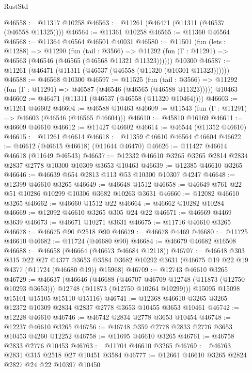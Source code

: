 \begin{lexlean}{RustStd}
\begin{coremodule}
@46558 := @11317 @10258
@46563 := @11261 (@46471 (@11311 (@46537 (@46558 @11325))))
@46564 := @11361 @10258
@46565 := @11360 @46564
@46568 := @11364 @46564 @46501 @40031
@46580 := @11501
    (fun (lets : @11288) =>
    @11290
      (fun (tail : @3566) =>
      @11292 (fun (Γ : @11291) => @46563 (@46546 (@46565 (@46568 @11321 @11323))))))
    @10300
@46587 := @11261 (@46471 (@11311 (@46537 (@46558 (@11320 (@10301 @11323))))))
@46588 := @46568 @10300
@46597 := @11525
    (fun (tail : @3566) => @11292 (fun (Γ : @11291) => @46587 (@46546 (@46565 (@46588 @11323)))))
    @10463
@46602 := @46471 (@11311 (@46537 (@46558 (@11320 @10464))))
@46603 := @11261 @46602
@46604 := @46588 @10463
@46609 := @11543 (fun (Γ : @11291) => @46603 (@46546 (@46565 @46604)))
@46610 := @45810 @16169
@46611 := @46609 @46610
@46612 := @11427 @46602
@46614 := @46544 (@11352 @46610)
@46615 := @11261 @46614
@46618 := @11359 @46610 @46564 @46604
@46622 := @46612 (@46615 @46618) (@11644 @46470)
@46626 := @11427 @46614 @46618 (@11649 @46543)
@46637 := @12332 @46610 @3265 @3265 @2814 @2834 @2837 @2778 @10300 @10309 @3653 @10463
@46639 := @12385 @46610 @3265
@46646 := @46639 @654 @2813 @113 @53 @10300 @10307 @4247
@46648 := @12399 @46610 @3265
@46649 := @46648 @1512
@46658 := @46649 @761 @22 @51 @10286 @10299 @10306 @3682 @10263 @3631
@46660 := @12082 @46610 @3265
@46662 := @46660 @1512 @22
@46664 := @46662 @10282 @10284
@46669 := @12092 @46610 @3265 @305 @24 @22
@46671 := @46669 @4469 @3639
@46673 := @46671 @10271 @3631
@46675 := @11716 @46610 @3265
@46678 := @46675 @90 @2518 @90
@46679 := @46678 @4469
@46680 := @11725 @46610
@46682 := @11724 (@46680 @90)
@46684 := @46679 @46682 @16508
@46688 := @46658 (@46664 (@46673 @46684 @12118))
@46707 := @46648
    @303
    @315
    @22
    @27
    @4377
    @3653
    @3584
    @3682
    @10292
    @3631
    (@46675 @19 @22 @19 @4377 (@11724 (@46680 @19)) @15968)
@46709 := @12743 @46610 @3265
@46729 := @46637
    (@46646
      (@46688
        (@46707 @46709 @12748 (@11873 (@12750 @10293 @3653)))
        @12748
        (@11873 (@12750 @10264 @10299)))
      @15095
      @15098
      @15101
      @15105
      @15110
      @15116)
@46741 := @12368 @46610 @3265 @3265 @12372 @10309 @2834 @2837 @2778 @3653 @10455 @3653 @10461
@46742 := @12228 @46610
@46746 := @46742 @2834 @2778 @3653 @10454
@46748 := @12237 @46610 @3265
@46756 := @46748 @359 @2778 @2833 @2776 @3653 @10453 @4260 @12252
@46758 := @11695 @46610 @3265
@46761 := @46758 @2833 @2776 @10453
@46763 := @11704 @46610 @3265
@46769 := @46763 @2831 @315 @2518 @27 @10451 @3584
@46777 := @12661 @46610 @3265 @2824 @2827 @24 @22 @10397 @10450

\end{coremodule}
\end{lexlean}
